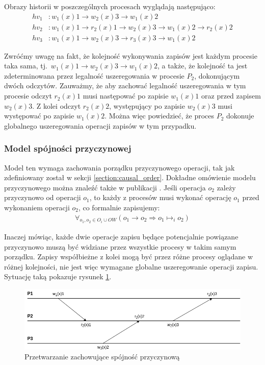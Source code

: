 Obrazy historii w poszczególnych procesach wyglądają następująco:
\begin{align*}
    hv_1&: w_1(x)1 \rightarrow w_2(x)3 \rightarrow w_1(x)2 \\
    hv_2&: w_1(x)1 \rightarrow r_2(x)1 \rightarrow w_2(x)3 \rightarrow w_1(x)2 \rightarrow r_2(x)2 \\
    hv_3&: w_1(x)1 \rightarrow w_2(x)3 \rightarrow r_3(x)3 \rightarrow w_1(x)2
\end{align*}

Zwróćmy uwagę na fakt, że kolejność wykonywania zapisów jest każdym procesie taka sama, tj.\ $ w_1(x)1 \rightarrow w_2(x)3 \rightarrow w_1(x)2 $, a także, że kolejność ta jest zdeterminowana przez legalność uszeregowania w procesie $ P_2 $, dokonującym dwóch odczytów. Zauważmy, że aby zachować legalność uszeregowania w tym procesie odczyt $ r_2(x)1 $ musi następować po zapisie $ w_1(x)1 $ oraz przed zapisem $ w_2(x)3 $. Z kolei odczyt $ r_2(x)2 $, występujący po zapisie $ w_2(x)3 $ musi występować po zapisie $ w_1(x)2 $. Można więc powiedzieć, że proces $ P_2 $ dokonuje globalnego uszeregowania operacji zapisów w tym przypadku.

\subsubsection{Model spójności przyczynowej}

Model ten wymaga zachowania porządku przyczynowego operacji, tak jak zdefiniowany został w sekcji \ref{section:causal_order}. Dokładne omówienie modelu przyczynowego można znaleźć także w publikacji \cite{ahamad:95}. Jeśli operacja $ o_2 $ zależy przyczynowo od operacji $ o_1 $, to każdy z procesów musi wykonać operację $ o_1 $ przed wykonaniem operacji $ o_2 $, co formalnie zapisujemy:
\begin{align*}
    \forall_{o_1, o_2 \in O_i \cup OW} (o_1 \rightarrow o_2 \Rightarrow o_1 \mapsto_i o_2)
\end{align*}

Inaczej mówiąc, każde dwie operacje zapisu będące potencjalnie powiązane przyczynowo muszą być widziane przez wszystkie procesy w takim samym porządku. Zapisy współbieżne z kolei mogą być przez różne procesy oglądane w różnej kolejności, nie jest więc wymagane globalne uszeregowanie operacji zapisu. Sytuację taką pokazuje rysunek \ref{figure:replication_causal}.

\begin{figure}[t!]
    \includegraphics[width=\linewidth]{images/02-causal.png}
    \caption{Przetwarzanie zachowujące spójność przyczynową}
    \label{figure:replication_causal}
\end{figure}

